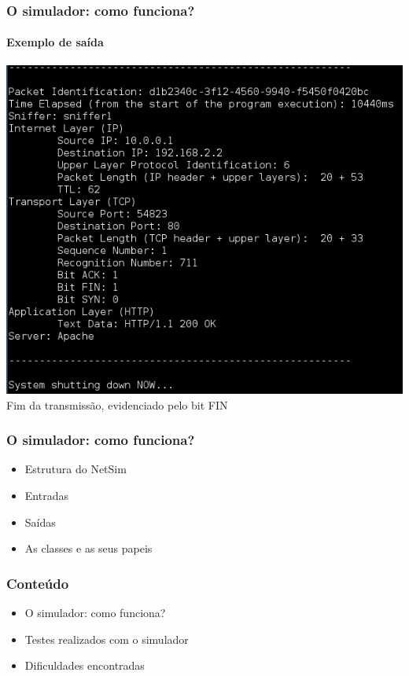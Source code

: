 \documentclass{beamer}
\begin{document}
\begin{frame}
	\frametitle{O simulador: como funciona?}
	\framesubtitle{Exemplo de saída}
		\begin{center}
			\includegraphics[scale=0.35]{printscreen3.png}\\
			Fim da transmissão, evidenciado pelo bit FIN
		\end{center}
\end{frame}

\begin{frame}
	\frametitle{O simulador: como funciona?}
	\begin{itemize}
		\item \textcolor{covered}{Estrutura do NetSim}
		\item \textcolor{covered}{Entradas}
		\item \textcolor{covered}{Saídas}
		\item \textcolor{covered}{As classes e as seus papeis}
	\end{itemize}
\end{frame}

\begin{frame}
	\frametitle{Conteúdo}
	\begin{itemize}
		\item \textcolor{covered}{O simulador: como funciona?}
		\item Testes realizados com o simulador
		\item Dificuldades encontradas
	\end{itemize}
\end{frame}
\end{document}
